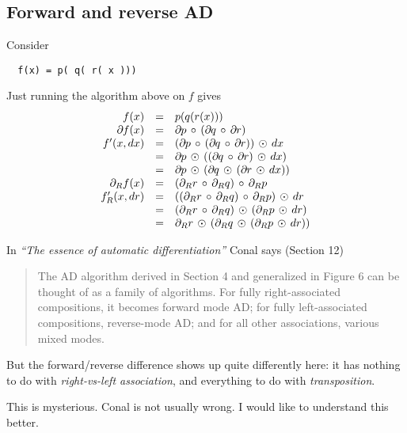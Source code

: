 \documentclass[sigplan,review]{acmart}
\newcommand{\deriv}{\partial}  %
\newcommand{\gradf}[1]{\deriv\hspace{-0.15mm} #1}  %
\newcommand{\gradft}[1]{\deriv_R#1}  %
\newcommand{\fwdDf}[1]{#1'}  %
\newcommand{\revDf}[1]{#1'_R}  %
\newcommand{\lmcomp}{\,\circ\,}   %
\newcommand{\lmapply}{\,\odot\,}      %
\newcommand{\tom}[1]{}
\begin{document}
\subsection{Forward and reverse AD}

Consider
\begin{lstlisting}
  f(x) = p( q( r( x )))
\end{lstlisting}
Just running the algorithm above on $f$ gives
$$
\begin{array}{rcl}
  f(x)  & = & p( q( r( x ))) \\
  \gradf{f}(x) & = & \gradf{p} \lmcomp (\gradf{q} \lmcomp \gradf{r}) \\
  \fwdDf{f}(x,dx) & = & (\gradf{p} \lmcomp (\gradf{q} \lmcomp \gradf{r})) \lmapply dx \\
  & = & \gradf{p} \lmapply ((\gradf{q} \lmcomp \gradf{r}) \lmapply dx) \\
  & = & \gradf{p} \lmapply (\gradf{q} \lmapply (\gradf{r} \lmapply dx)) \\
  \gradft{f}(x) & = & (\gradft{r} \lmcomp \gradft{q}) \lmcomp \gradft{p} \\
  \revDf{f}(x,dr) & = & ((\gradft{r} \lmcomp \gradft{q}) \lmcomp \gradft{p}) \lmapply dr \\
     & = & (\gradft{r} \lmcomp \gradft{q}) \lmapply (\gradft{p} \lmapply dr) \\
     & = & \gradft{r} \lmapply (\gradft{q} \lmapply (\gradft{p} \lmapply dr)) \\
\end{array}
$$

In \emph{``The essence of automatic differentiation''} Conal says (Section 12)
\begin{quote}
The AD algorithm derived in Section 4 and generalized in Figure 6 can be thought of as a family
of algorithms. For fully right-associated compositions, it becomes forward mode AD; for fully
left-associated compositions, reverse-mode AD; and for all other associations, various mixed modes.
\end{quote}
But the forward/reverse difference shows up quite differently here: it has nothing to do
with \emph{right-vs-left association}, and everything to do with \emph{transposition}.

This is mysterious.  Conal is not usually wrong.  I would like to
understand this better.
\tom{I was also puzzled by this.  Conal's claim is suspicious to me,
  but firstly it's very cool and secondly it's Conal, so I want it to
  be true and I still hope it is.}
\end{document}

